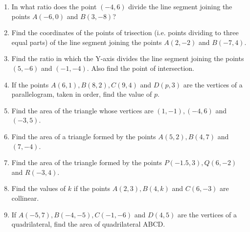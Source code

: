 \documentclass{article}
\theoremstyle{remark}
\begin{document}
\begin{enumerate}
\item In what ratio does the point $(-4,6)$ divide the line segment joining the points $A(-6,0)$ and $B(3,-8)$?
\item Find the coordinates of the points of trisection (i.e. points dividing to three equal parts) of the line segment joining the points $A(2,-2)$ and $B(-7,4)$.
\item Find the ratio in which the Y-axis divides the line segment joining the points $(5,-6)$ and $(-1,-4)$. Also find the point of intersection.
\item If the points $A(6,1),B(8,2), C(9,4)$ and $D(p,3)$ are the vertices of a parallelogram, taken in order, find the value of $p$.
\item Find the area of the triangle whose vertices are $(1,-1), (-4,6)$ and $(-3,5)$.
\item Find the area of a triangle formed by the points $A(5,2), B(4,7)$ and $(7,-4)$.
\item Find the area of the triangle formed by the points $P(-1.5,3), Q(6,-2)$ and $R(-3,4)$.
\item Find the values of $k$ if the points $A(2,3), B(4,k)$ and $C(6,-3)$ are collinear.
\item If $A(-5,7), B(-4,-5), C(-1,-6)$ and $D(4,5)$ are the vertices of a quadrilateral, find the area of quadrilateral ABCD.
\end{enumerate}
\end{document}

